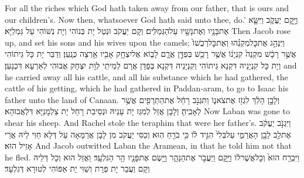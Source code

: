 {For all the riches which God hath taken away from our father, that is ours and our children’s. Now then, whatsoever God hath said unto thee, do.’}{}
{וַיָּ֖קׇם יַעֲקֹ֑ב וַיִּשָּׂ֛א אֶת\maqqaf בָּנָ֥יו וְאֶת\maqqaf נָשָׁ֖יו עַל\maqqaf הַגְּמַלִּֽים׃}
{וְקָם יַעֲקֹב וּנְטַל יָת בְּנוֹהִי וְיָת נְשׁוֹהִי עַל גַּמְלַיָּא׃}
{Then Jacob rose up, and set his sons and his wives upon the camels;}{}
{וַיִּנְהַ֣ג אֶת\maqqaf כׇּל\maqqaf מִקְנֵ֗הוּ וְאֶת\maqqaf כׇּל\maqqaf רְכֻשׁוֹ֙ אֲשֶׁ֣ר רָכָ֔שׁ מִקְנֵה֙ קִנְיָנ֔וֹ אֲשֶׁ֥ר רָכַ֖שׁ בְּפַדַּ֣ן אֲרָ֑ם לָב֛וֹא אֶל\maqqaf יִצְחָ֥ק אָבִ֖יו אַ֥רְצָה כְּנָֽעַן׃}
{וְדַבַּר יָת כָּל גֵּיתוֹהִי וְיָת כָּל קִנְיָנֵיהּ דִּקְנָא גֵּיתוֹהִי וְקִנְיָנֵיהּ דִּקְנָא בְּפַדַּן אֲרָם לְמֵיתֵי לְוָת יִצְחָק אֲבוּהִי לְאַרְעָא דִּכְנָעַן׃}
{and he carried away all his cattle, and all his substance which he had gathered, the cattle of his getting, which he had gathered in Paddan-aram, to go to Isaac his father unto the land of Canaan.}{}
{וְלָבָ֣ן הָלַ֔ךְ לִגְזֹ֖ז אֶת\maqqaf צֹאנ֑וֹ וַתִּגְנֹ֣ב רָחֵ֔ל אֶת\maqqaf הַתְּרָפִ֖ים אֲשֶׁ֥ר לְאָבִֽיהָ׃}
{וְלָבָן אֲזַל לְמִגַּז יָת עָנֵיהּ וּנְסֵיבַת רָחֵל יָת צַלְמָנַיָּא דִּלְאֲבוּהָא׃}
{Now Laban was gone to shear his sheep. And Rachel stole the teraphim that were her father’s.}{}
{וַיִּגְנֹ֣ב יַעֲקֹ֔ב אֶת\maqqaf לֵ֥ב לָבָ֖ן הָאֲרַמִּ֑י עַל\maqqaf בְּלִי֙ הִגִּ֣יד ל֔וֹ כִּ֥י בֹרֵ֖חַ הֽוּא׃}
{וְכַסִּי יַעֲקֹב מִן לָבָן אֲרַמָּאָה עַל דְּלָא חַוִּי לֵיהּ אֲרֵי אָזֵיל הוּא׃}
{And Jacob outwitted Laban the Aramean, in that he told him not that he fled.}{}
{וַיִּבְרַ֥ח הוּא֙ וְכׇל\maqqaf אֲשֶׁר\maqqaf ל֔וֹ וַיָּ֖קׇם וַיַּעֲבֹ֣ר אֶת\maqqaf הַנָּהָ֑ר וַיָּ֥שֶׂם אֶת\maqqaf פָּנָ֖יו הַ֥ר הַגִּלְעָֽד׃}
{וַאֲזַל הוּא וְכָל דְּלֵיהּ וְקָם וַעֲבַר יָת פְּרָת וְשַׁוִּי יָת אַפּוֹהִי לְטוּרָא דְּגִלְעָד׃}
